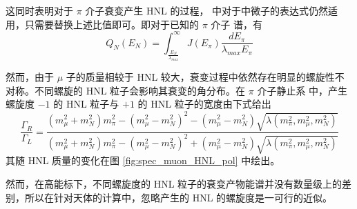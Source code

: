 \documentclass[UTF8]{ctexart}
\begin{document}
这同时表明对于 $\pi$ 介子衰变产生 HNL 的过程，\cite{kelner2006energy} 中对于中微子的表达式仍然适用，只需要替换上述比值即可。即对于已知的 $\pi$ 介子
谱，有
\begin{equation}
  Q_{N}(E_N) = \int_{\frac{E_N}{\lambda_{max}}}^{\infty} J(E_\pi) \frac{d E_\pi}{\lambda_{max} E_\pi} \label{eq:hnl_spec_from_pion}
\end{equation}

然而，由于 $\mu$ 子的质量相较于 HNL 较大，衰变过程中依然存在明显的螺旋性不对称。不同螺旋的 HNL 粒子会影响其衰变的角分布。在 $\pi$ 介子静止系
中，产生螺旋度 $-1$ 的 HNL 粒子与 $+1$ 的 HNL 粒子的宽度由下式给出
\begin{equation}
   \frac{\Gamma_R}{\Gamma_L} = \frac{(m_\mu^2 + m_N^2) m_\pi^2 - (m_\mu^2 - m_N^2)^2 - (m_\mu^2 - m_N^2) \sqrt{\lambda(m_\pi^2, m_\mu^2, m_N^2)}}
   {(m_\mu^2 + m_N^2) m_\pi^2 - (m_\mu^2 - m_N^2)^2 + (m_\mu^2 - m_N^2) \sqrt{\lambda(m_\pi^2, m_\mu^2, m_N^2)}} \label{eq:hnl_hel_pion}
\end{equation}
其随 HNL 质量的变化在图 \ref{fig:spec_muon_HNL_pol} 中绘出。

然而，在高能标下，不同螺旋度的 HNL 粒子的衰变产物能谱并没有数量级上的差别，所以在针对天体的计算中，忽略产生的 HNL 的螺旋度是一可行的近似。

%   
\end{document}

